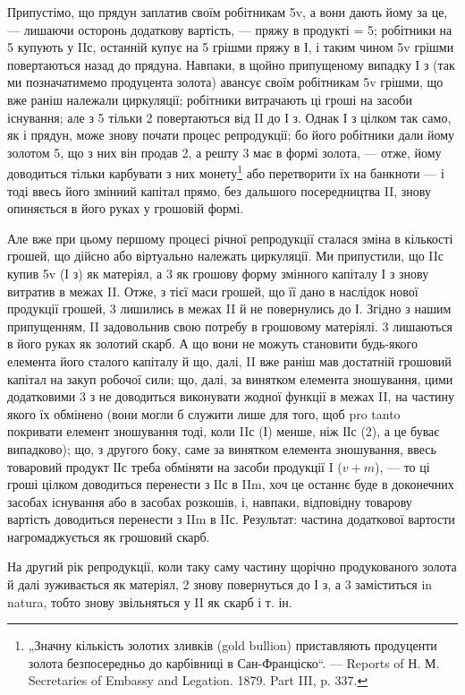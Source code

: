 Припустімо, що прядун заплатив своїм робітникам 5v, а вони дають
йому за це, — лишаючи осторонь додаткову вартість, — пряжу в продукті = 5;
робітники на 5 купують у IIс, останній купує на 5 грішми пряжу в І, і
таким чином 5v грішми повертаються назад до прядуна. Навпаки, в
щойно припущеному випадку І з (так ми позначатимемо продуцента
золота) авансує своїм робітникам 5v грішми, що вже раніш належали
циркуляції; робітники витрачають ці гроші на засоби існування; але з
5 тільки 2 повертаються від II до І з. Однак І з цілком так само, як і
прядун, може знову почати процес репродукції; бо його робітники дали
йому золотом 5, що з них він продав 2, а решту 3 має в формі золота, —
отже, йому доводиться тільки карбувати з них монету\footnote{
„Значну кількість золотих зливків (gold bullion) приставляють продуценти
золота безпосередньо до карбівниці в Сан-Франціско“. — Reports of Н. М. Secretaries
of Embassy and Legation. 1879. Part III, p. 337.
} або перетворити
їх на банкноти — і тоді ввесь його змінний капітал прямо, без
дальшого посередництва II, знову опиняється в його руках у грошовій
формі.

Але вже при цьому першому процесі річної репродукції сталася зміна
в кількості грошей, що дійсно або віртуально належать циркуляції. Ми
припустили, що IIс купив 5v (І з) як матеріял, а 3 як грошову форму
змінного капіталу І з знову витратив в межах II. Отже, з тієї маси грошей,
що її дано в наслідок нової продукції грошей, 3 лишились в межах
II й не повернулись до І. Згідно з нашим припущенням, II задовольнив
свою потребу в грошовому матеріялі. 3 лишаються в його руках як
золотий скарб. А що вони не можуть становити будь-якого елемента
його сталого капіталу й що, далі, II вже раніш мав достатній грошовий
капітал на закуп робочої сили; що, далі, за винятком елемента зношування,
цими додатковими 3 з не доводиться виконувати жодної функції в межах II,
на частину якого їх обмінено (вони могли б служити лише для того,
щоб pro tanto покривати елемент зношування тоді, коли IIс (І) менше,
ніж ІІс (2), а це буває випадково); що, з другого боку, саме за винятком
елемента зношування, ввесь товаровий продукт ІІс треба обміняти на
засоби продукції I ($v + m$), — то ці гроші цілком доводиться перенести
з ІІс в IIm, хоч це останнє буде в доконечних засобах існування або в
засобах розкошів, і, навпаки, відповідну товарову вартість доводиться
перенести з IIm в IIс. Результат: частина додаткової вартости нагромаджується
як грошовий скарб.

На другий рік репродукції, коли таку саму частину щорічно продукованого
золота й далі зуживається як матеріял, 2 знову повернуться
до І з, а 3 заміститься in natura, тобто знову звільняться у II як скарб
і т. ін.

